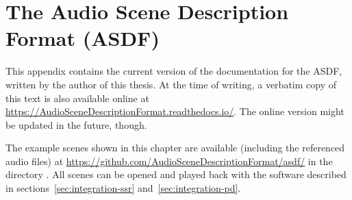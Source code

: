\chapter{The Audio Scene Description Format (ASDF)}
\label{sec:asdf}

This appendix contains the current version
of the documentation for the ASDF,
written by the author of this thesis.
At the time of writing,
a verbatim copy of this text
is also available online at
\url{https://AudioSceneDescriptionFormat.readthedocs.io/}.
The online version might be updated in the future, though.

The example scenes shown in this chapter are available
(including the referenced audio files)
at \url{https://github.com/AudioSceneDescriptionFormat/asdf/}
in the directory .
All scenes can be opened and played back with the software
described in sections~\ref{sec:integration-ssr} and~\ref{sec:integration-pd}.


